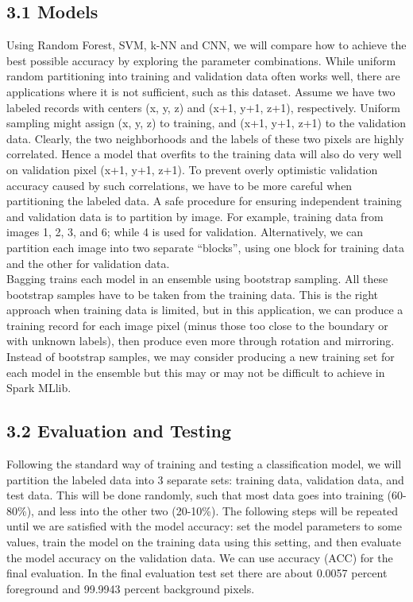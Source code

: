 \documentclass{neu_handout}
\begin{document}
\subsection*{3.1 Models}
Using Random Forest, SVM, k-NN and CNN, we will compare how to achieve the best possible accuracy by exploring the parameter combinations. While uniform random partitioning into training and validation data often works well, there are
applications where it is not sufficient, such as this dataset. Assume we have two labeled
records with centers (x, y, z) and (x+1, y+1, z+1), respectively. Uniform sampling might assign (x, y, z) to
training, and (x+1, y+1, z+1) to the validation data. Clearly, the two neighborhoods and the labels of
these two pixels are highly correlated. Hence a model that overfits to the training data will also do very
well on validation pixel (x+1, y+1, z+1). To prevent overly optimistic validation accuracy caused by such
correlations, we have to be more careful when partitioning the labeled data. A safe procedure for 
ensuring independent training and validation data is to partition by image. For example, training data from images 1, 2, 3, and 6; while 4 is used for validation. Alternatively, we can partition each
image into two separate “blocks”, using one block for training data and the other for validation data.\\

Bagging trains each model in an ensemble using bootstrap sampling. All these bootstrap samples have to be taken from the training data. This is the right approach when training data is limited, but in this application, we can produce a training record for each image pixel (minus those too close to the boundary or with unknown labels), then produce even more through rotation and mirroring. Instead of bootstrap samples, we may consider producing a new training set for each model in the ensemble but this may or may not be difficult to achieve in Spark MLlib.

\subsection*{3.2 Evaluation and Testing}
Following the standard way of training and testing a classification model, we will partition the labeled data into 3 separate sets: training data, validation data, and test data. This will be done randomly, such that most data goes into training (60-80\%), and less into the other two (20-10\%). The following steps will be repeated until we are satisfied with the model accuracy: set the model parameters to some values, train the model on the training data using this setting, and then evaluate the model accuracy on the validation data. We can use accuracy (ACC) for the final evaluation. In the final evaluation test set there are about 0.0057 percent foreground and 99.9943 percent background pixels.\\
\end{document}
